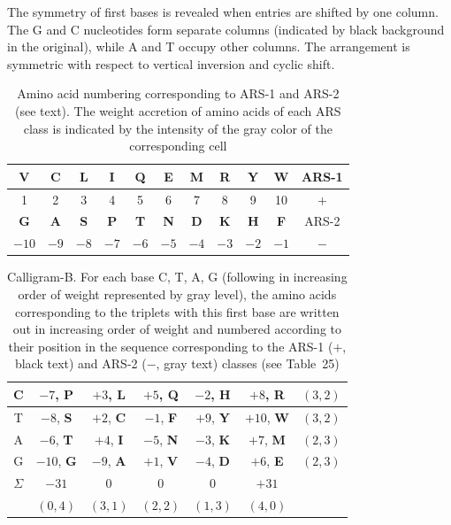 \documentclass[12pt]{article}
\begin{document}
The symmetry of first bases is revealed when entries are shifted by one column. The G and C nucleotides form separate columns (indicated by black background in the original), while A and T occupy other columns. The arrangement is symmetric with respect to vertical inversion and cyclic shift.

\begin{table}[htbp]
\centering
\caption{Amino acid numbering corresponding to ARS-1 and ARS-2 (see text). The weight accretion of amino acids of each ARS class is indicated by the intensity of the gray color of the corresponding cell}
\label{tab:ARS_numbering}
\begin{tabular}{|c|c|c|c|c|c|c|c|c|c|c|}
\hline
\textbf{V} & \textbf{C} & \textbf{L} & \textbf{I} & \textbf{Q} & \textbf{E} & \textbf{M} & \textbf{R} & \textbf{Y} & \textbf{W} & ARS-1 \\
\hline
1 & 2 & 3 & 4 & 5 & 6 & 7 & 8 & 9 & 10 & $+$ \\
\hline
\textbf{G} & \textbf{A} & \textbf{S} & \textbf{P} & \textbf{T} & \textbf{N} & \textbf{D} & \textbf{K} & \textbf{H} & \textbf{F} & ARS-2 \\
\hline
$-10$ & $-9$ & $-8$ & $-7$ & $-6$ & $-5$ & $-4$ & $-3$ & $-2$ & $-1$ & $-$ \\
\hline
\end{tabular}
\end{table}

\begin{table}[htbp]
\centering
\caption{Calligram-B. For each base C, T, A, G (following in increasing order of weight represented by gray level), the amino acids corresponding to the triplets with this first base are written out in increasing order of weight and numbered according to their position in the sequence corresponding to the ARS-1 ($+$, black text) and ARS-2 ($-$, gray text) classes (see Table~25)}
\label{tab:calligram_B}
\begin{tabular}{|c|c|c|c|c|c|c|}
\hline
C & $-7$, \textbf{P} & $+3$, \textbf{L} & $+5$, \textbf{Q} & $-2$, \textbf{H} & $+8$, \textbf{R} & $(3, 2)$ \\
\hline
T & $-8$, \textbf{S} & $+2$, \textbf{C} & $-1$, \textbf{F} & $+9$, \textbf{Y} & $+10$, \textbf{W} & $(3, 2)$ \\
\hline
A & $-6$, \textbf{T} & $+4$, \textbf{I} & $-5$, \textbf{N} & $-3$, \textbf{K} & $+7$, \textbf{M} & $(2, 3)$ \\
\hline
G & $-10$, \textbf{G} & $-9$, \textbf{A} & $+1$, \textbf{V} & $-4$, \textbf{D} & $+6$, \textbf{E} & $(2, 3)$ \\
\hline
$\Sigma$ & $-31$ & 0 & 0 & 0 & $+31$ & \\
\hline
 & $(0, 4)$ & $(3, 1)$ & $(2, 2)$ & $(1, 3)$ & $(4, 0)$ & \\
\hline
\end{tabular}
\end{table}
\end{document}
